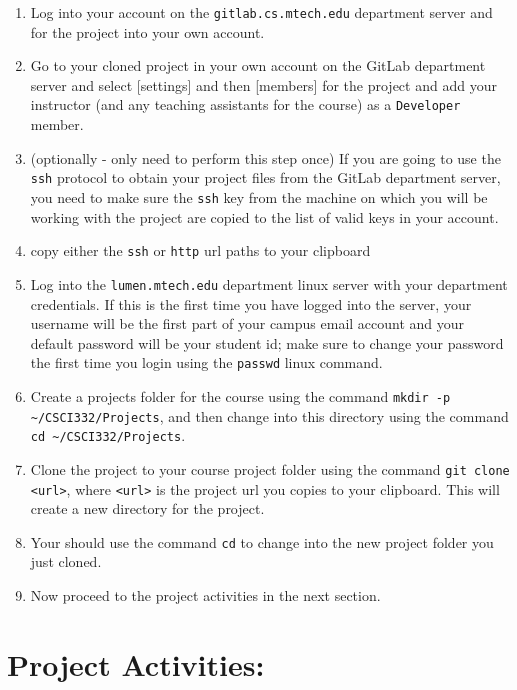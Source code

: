 \documentclass[10pt]{article}
\begin{document}
\begin{enumerate}
   \item Log into your account on the \verb|gitlab.cs.mtech.edu| department server and for the project into your own account.
   
   \item Go to your cloned project in your own account on the GitLab department server and select [settings] and then [members] for the project and add your instructor (and any teaching assistants for the course) as a \verb|Developer| member. 
   
   \item (optionally - only need to perform this step once) If you are going to use the \verb|ssh| protocol to obtain your project files from the GitLab department server, you need to make sure the \verb|ssh| key from the machine on which you will be working with the project are copied to the list of valid keys in your account.
   
   \item copy either the \verb|ssh| or \verb|http| url paths to your clipboard
   
   \item Log into the \verb|lumen.mtech.edu| department linux server with your department credentials. If this is the first time you have logged into the server, your username will be the first part of your campus email account and your default password will be your student id; make sure to change your password the first time you login using the \verb|passwd| linux command.
   
   \item Create a projects folder for the course using the command \verb|mkdir -p ~/CSCI332/Projects|, and then change into this directory using the command \verb|cd ~/CSCI332/Projects|.
   
   \item Clone the project to your course project folder using the command \verb|git clone <url>|, where \verb|<url>| is the project url you copies to your clipboard. This will create a new directory for the project. 
   
   \item Your should use the command \verb|cd| to change into the new project folder you just cloned.
   
   \item Now proceed to the project activities in the next section.
\end{enumerate}

\section*{Project Activities:}
\end{document}

